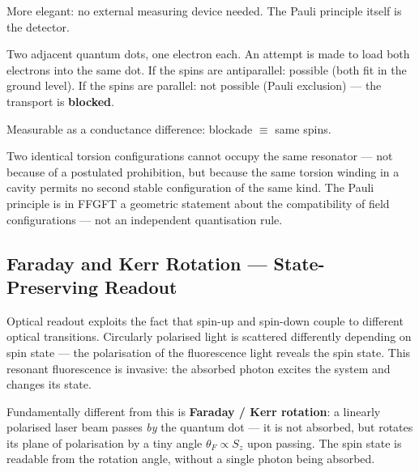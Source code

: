 More elegant: no external measuring device needed.
The Pauli principle itself is the detector.

Two adjacent quantum dots, one electron each.
An attempt is made to load both electrons into the same dot.
If the spins are antiparallel: possible (both fit in the ground level).
If the spins are parallel: not possible (Pauli exclusion) ---
the transport is \textbf{blocked}.

Measurable as a conductance difference: blockade $\equiv$ same spins.

\begin{foundation}
Two identical torsion configurations cannot
occupy the same resonator --- not because of a
postulated prohibition, but because the same torsion winding
in a cavity permits no second stable configuration
of the same kind.
The Pauli principle is in FFGFT a geometric statement
about the compatibility of field configurations ---
not an independent quantisation rule.
\end{foundation}

\subsection{Faraday and Kerr Rotation --- State-Preserving Readout}
\label{sec:optical-readout}

Optical readout exploits the fact that spin-up and spin-down
couple to different optical transitions.
Circularly polarised light is scattered differently depending on spin state ---
the polarisation of the fluorescence light reveals the spin state.
This resonant fluorescence is invasive: the absorbed
photon excites the system and changes its state.

Fundamentally different from this is
\textbf{Faraday / Kerr rotation}:
a linearly polarised laser beam passes \emph{by} the quantum dot ---
it is not absorbed, but rotates its plane of polarisation
by a tiny angle
$\theta_F \propto S_z$ upon passing.
The spin state is readable from the rotation angle,
without a single photon being absorbed.


